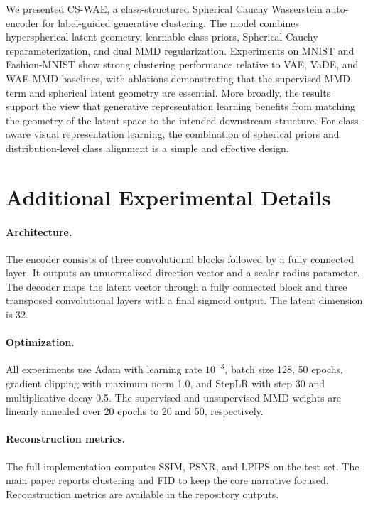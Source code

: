 \documentclass[10pt]{article}
\begin{document}
We presented CS-WAE, a class-structured Spherical Cauchy Wasserstein auto-encoder for label-guided generative clustering. The model combines hyperspherical latent geometry, learnable class priors, Spherical Cauchy reparameterization, and dual MMD regularization. Experiments on MNIST and Fashion-MNIST show strong clustering performance relative to VAE, VaDE, and WAE-MMD baselines, with ablations demonstrating that the supervised MMD term and spherical latent geometry are essential. More broadly, the results support the view that generative representation learning benefits from matching the geometry of the latent space to the intended downstream structure. For class-aware visual representation learning, the combination of spherical priors and distribution-level class alignment is a simple and effective design.




\appendix

\section{Additional Experimental Details}

\paragraph{Architecture.}
The encoder consists of three convolutional blocks followed by a fully connected layer. It outputs an unnormalized direction vector and a scalar radius parameter. The decoder maps the latent vector through a fully connected block and three transposed convolutional layers with a final sigmoid output. The latent dimension is 32.

\paragraph{Optimization.}
All experiments use Adam with learning rate $10^{-3}$, batch size 128, 50 epochs, gradient clipping with maximum norm 1.0, and StepLR with step 30 and multiplicative decay 0.5. The supervised and unsupervised MMD weights are linearly annealed over 20 epochs to 20 and 50, respectively.

\paragraph{Reconstruction metrics.}
The full implementation computes SSIM, PSNR, and LPIPS on the test set. The main paper reports clustering and FID to keep the core narrative focused. Reconstruction metrics are available in the repository outputs.
\end{document}
